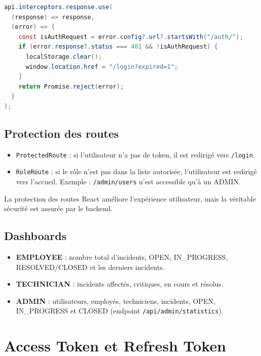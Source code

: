 \documentclass{rapportENSET}
\begin{document}
\begin{lstlisting}[language=Java]
api.interceptors.response.use(
  (response) => response,
  (error) => {
    const isAuthRequest = error.config?.url?.startsWith("/auth/");
    if (error.response?.status === 401 && !isAuthRequest) {
      localStorage.clear();
      window.location.href = "/login?expired=1";
    }
    return Promise.reject(error);
  }
);
\end{lstlisting}

\subsection{Protection des routes}

\begin{itemize}
  \item \texttt{ProtectedRoute} : si l'utilisateur n'a pas de token, il est redirig\'e vers \texttt{/login}.
  \item \texttt{RoleRoute} : si le r\^ole n'est pas dans la liste autoris\'ee, l'utilisateur est redirig\'e vers l'accueil. Exemple : \texttt{/admin/users} n'est accessible qu'\`a un ADMIN.
\end{itemize}

\begin{alertbox}
La protection des routes React am\'eliore l'exp\'erience utilisateur, mais la v\'eritable s\'ecurit\'e est assur\'ee par le backend.
\end{alertbox}

\subsection{Dashboards}

\begin{itemize}
  \item \textbf{EMPLOYEE} : nombre total d'incidents, OPEN, IN\_PROGRESS, RESOLVED/CLOSED et les derniers incidents.
  \item \textbf{TECHNICIAN} : incidents affect\'es, critiques, en cours et r\'esolus.
  \item \textbf{ADMIN} : utilisateurs, employ\'es, techniciens, incidents, OPEN, IN\_PROGRESS et CLOSED (endpoint \texttt{/api/admin/statistics}).
\end{itemize}

\section{Access Token et Refresh Token}
\end{document}
